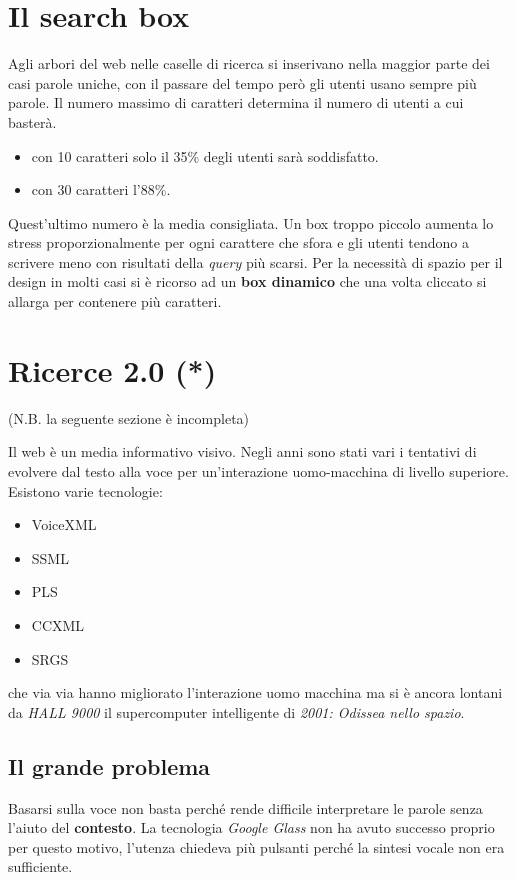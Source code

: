 	\section{Il search box}
		Agli arbori del web nelle caselle di ricerca si inserivano nella maggior parte dei casi parole uniche, con il passare del tempo però gli utenti usano sempre più parole. Il numero massimo di caratteri determina il numero di utenti a cui basterà.
		\begin{itemize}
			\item con 10 caratteri solo il 35\% degli utenti sarà soddisfatto.
			\item con 30 caratteri l'88\%.
		\end{itemize}
		Quest'ultimo numero è la media consigliata. Un box troppo piccolo aumenta lo stress proporzionalmente per ogni carattere che sfora e gli utenti tendono a scrivere meno con risultati della \emph{query} più scarsi.
		Per la necessità di spazio per il design in molti casi si è ricorso ad un \textbf{box dinamico} che una volta cliccato si allarga per contenere più caratteri.
	
	\section{Ricerce 2.0 (*)}
		(N.B. la seguente sezione è incompleta)
		
		Il web è un media informativo visivo. Negli anni sono stati vari i tentativi di evolvere dal testo alla voce per un'interazione uomo-macchina di livello superiore. Esistono varie tecnologie:
		\begin{itemize}
			\item VoiceXML
			\item SSML
			\item PLS
			\item CCXML
			\item SRGS
		\end{itemize}
		che via via hanno migliorato l'interazione uomo macchina ma si è ancora lontani da \emph{HALL 9000} il supercomputer intelligente di \emph{2001: Odissea nello spazio}.
		
		\subsection{Il grande problema}
			Basarsi sulla voce non basta perché rende difficile interpretare le parole senza l'aiuto del \textbf{contesto}.
			La tecnologia \emph{Google Glass} non ha avuto successo proprio per questo motivo, l'utenza chiedeva più pulsanti perché la sintesi vocale non era sufficiente.
			
